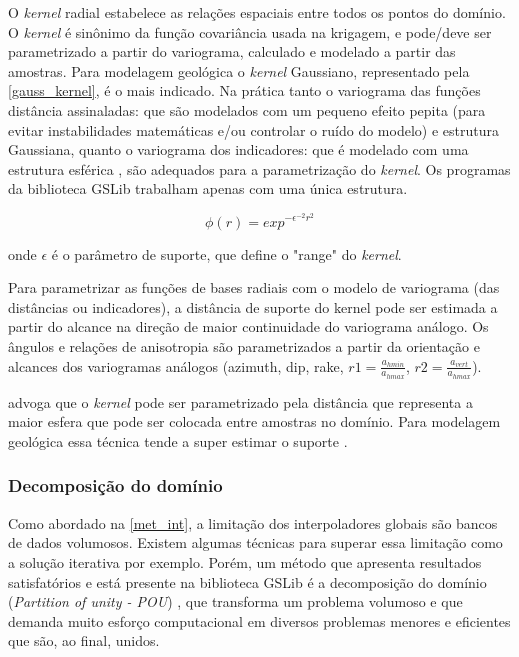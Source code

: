 O \textit{kernel} radial estabelece as relações espaciais entre todos os pontos do domínio. O \textit{kernel} 
é sinônimo da função covariância usada na krigagem, e pode/deve ser parametrizado a partir do variograma, calculado e modelado a partir das amostras. Para modelagem geológica o \textit{kernel} Gaussiano, representado pela \autoref{gauss_kernel}, é o mais indicado. Na prática tanto o variograma das funções distância assinaladas: que são modelados com um pequeno efeito pepita (para evitar instabilidades matemáticas e/ou controlar o ruído do modelo) e estrutura Gaussiana, quanto o variograma dos indicadores: que é modelado com uma estrutura esférica \cite{martin2017implicitmodeling}, são adequados para a parametrização do \textit{kernel}. Os programas da biblioteca GSLib trabalham apenas com uma única estrutura. 

\begin{equation}\label{gauss_kernel}
  \phi(r)=exp^{-\epsilon^{-2}r^2}  
\end{equation}

onde $\epsilon$ é o parâmetro de suporte, que define o "range" do \textit{kernel}.

Para parametrizar as funções de bases radiais com o modelo de variograma (das distâncias ou indicadores), a distância de suporte do kernel pode ser estimada a partir do alcance na direção de maior continuidade do variograma análogo. Os ângulos e relações de anisotropia são parametrizados a partir da orientação e alcances dos variogramas análogos (azimuth, dip, rake, $r1 = \frac{a_{hmin}}{a_{hmax}}$, $r2 = \frac{a_{vert}}{a_{hmax}}$).

 advoga que o \textit{kernel} pode ser parametrizado pela distância que representa a maior esfera que pode ser colocada entre amostras no domínio. Para modelagem geológica essa técnica tende a super estimar o suporte \cite{martin2017implicitmodeling}.

\subsubsection{Decomposição do domínio} \label{dom_decomp}

Como abordado na \autoref{met_int}, a limitação dos interpoladores globais são bancos de dados volumosos. Existem algumas técnicas para superar essa limitação como a solução iterativa \cite{beatson1999fast} por exemplo. Porém, um método que apresenta resultados satisfatórios e está presente na biblioteca GSLib é a decomposição do domínio (\textit{Partition of unity - POU}) \cite{wendland2004scattered}, que transforma um problema volumoso e que demanda muito esforço computacional em diversos problemas menores e eficientes que são, ao final, unidos.

